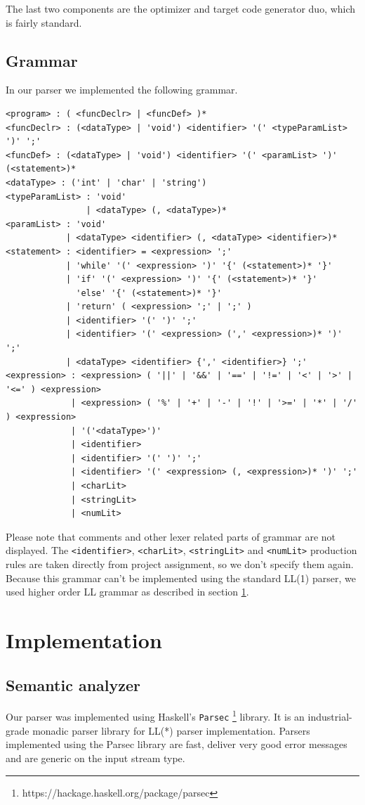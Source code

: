 \documentclass[titlepage]{article}
\begin{document}
The last two components are the optimizer and target code generator duo, which is fairly
standard.

\subsection{Grammar}
In our parser we implemented the following grammar.

\begin{verbatim}
<program> : ( <funcDeclr> | <funcDef> )*
<funcDeclr> : (<dataType> | 'void') <identifier> '(' <typeParamList> ')' ';'
<funcDef> : (<dataType> | 'void') <identifier> '(' <paramList> ')' (<statement>)*
<dataType> : ('int' | 'char' | 'string')
<typeParamList> : 'void'
                | <dataType> (, <dataType>)*
<paramList> : 'void'
            | <dataType> <identifier> (, <dataType> <identifier>)*
<statement> : <identifier> = <expression> ';'
            | 'while' '(' <expression> ')' '{' (<statement>)* '}'
            | 'if' '(' <expression> ')' '{' (<statement>)* '}'
              'else' '{' (<statement>)* '}'
            | 'return' ( <expression> ';' | ';' )
            | <identifier> '(' ')' ';'
            | <identifier> '(' <expression> (',' <expression>)* ')' ';'
            | <dataType> <identifier> {',' <identifier>} ';'
<expression> : <expression> ( '||' | '&&' | '==' | '!=' | '<' | '>' | '<=' ) <expression>
             | <expression> ( '%' | '+' | '-' | '!' | '>=' | '*' | '/' ) <expression>
             | '('<dataType>')'
             | <identifier>
             | <identifier> '(' ')' ';'
             | <identifier> '(' <expression> (, <expression>)* ')' ';'
             | <charLit>
             | <stringLit>
             | <numLit>
\end{verbatim}

Please note that comments and other lexer related parts of grammar are not displayed.
The \texttt{<identifier>}, \texttt{<charLit>}, \texttt{<stringLit>} and \texttt{<numLit>}
production rules are taken directly from project assignment, so we don't specify them
again. Because this grammar can't be implemented using the standard LL(1) parser, we
used higher order LL grammar as described in section \ref{sec:implementation}.

\section{Implementation}
\label{sec:implementation}

\subsection{Semantic analyzer}
Our parser was implemented using Haskell's \texttt{Parsec}
\footnote{https://hackage.haskell.org/package/parsec} library. It is
an industrial-grade monadic parser library for LL(*) parser implementation. Parsers
implemented using the Parsec library are fast, deliver very good error messages and
are generic on the input stream type.
\end{document}
